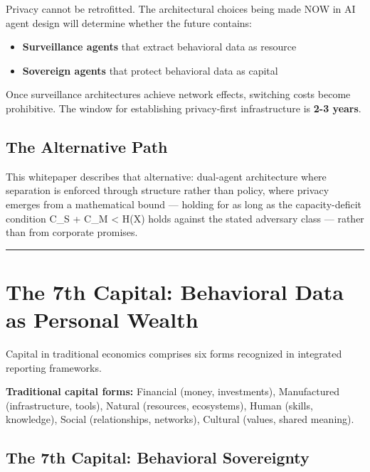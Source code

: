 \documentclass[
]{article}
\providecommand{\tightlist}{%
  \setlength{\itemsep}{0pt}\setlength{\parskip}{0pt}}
\begin{document}
Privacy cannot be retrofitted. The architectural choices being made NOW
in AI agent design will determine whether the future contains:

\begin{itemize}
\tightlist
\item
  \textbf{Surveillance agents} that extract behavioral data as resource
\item
  \textbf{Sovereign agents} that protect behavioral data as capital
\end{itemize}

Once surveillance architectures achieve network effects, switching costs
become prohibitive. The window for establishing privacy-first
infrastructure is \textbf{2-3 years}.

\subsection{The Alternative Path}\label{the-alternative-path}

This whitepaper describes that alternative: dual-agent architecture
where separation is enforced through structure rather than policy, where
privacy emerges from a mathematical bound --- holding for as long as the
capacity-deficit condition C\_S + C\_M \textless{} H(X) holds against
the stated adversary class --- rather than from corporate promises.

\begin{center}\rule{0.5\linewidth}{0.5pt}\end{center}

\section{The 7th Capital: Behavioral Data as Personal
Wealth}\label{the-7th-capital-behavioral-data-as-personal-wealth}

Capital in traditional economics comprises six forms recognized in
integrated reporting frameworks.

\textbf{Traditional capital forms:} Financial (money, investments),
Manufactured (infrastructure, tools), Natural (resources, ecosystems),
Human (skills, knowledge), Social (relationships, networks), Cultural
(values, shared meaning).

\subsection{The 7th Capital: Behavioral
Sovereignty}\label{the-7th-capital-behavioral-sovereignty}
\end{document}
